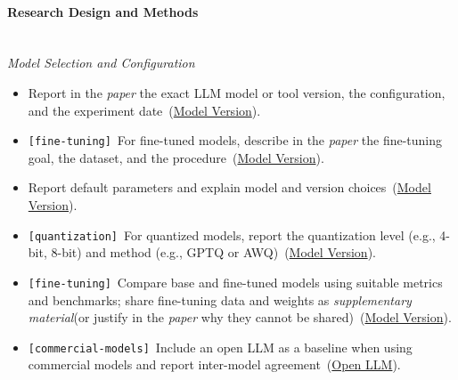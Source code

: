 \documentclass[smallextended]{svjour3}
\makeatletter
\newcommand{\must}{\textbf{must}\xspace}
\newcommand{\should}{\textbf{should}\xspace}
\newcommand{\paper}{\emph{paper}\xspace}
\newcommand{\supplementarymaterial}{\emph{supplementary material}\xspace}
\newcommand{\paper}{\emph{paper}\xspace}
\newcommand{\supplementarymaterial}{\emph{supplementary material}\xspace}
\newcommand{\iconM}{\usebox{\iconMbox}\xspace}
\newcommand{\iconS}{\usebox{\iconSbox}\xspace}
\newcommand{\iconM}{●\xspace}
\newcommand{\iconS}{○\xspace}
\newcommand{\condition}[1]{\texttt{\small[#1]}\,}
\newcommand{\condition}[1]{@@cond:#1@@}
\newcommand{\refmodelversion}{\hyperref[sec:report-model-version-configuration-and-customizations]{Model Version}}
\newcommand{\refopenllm}{\hyperref[sec:use-an-open-llm-as-a-baseline]{Open LLM}}
\newcommand{\refmodelversion}{\href{/guidelines/report-model-version-configuration-and-customizations/}{Model Version}}
\newcommand{\refopenllm}{\href{/guidelines/use-an-open-llm-as-a-baseline/}{Open LLM}}
\makeatother
\begin{document}
\begin{appendices}
\paragraph{\textbf{Research Design and Methods}}\mbox{}\\
\noindent\textit{Model Selection and Configuration}
\begin{itemize}[label={},leftmargin=*]
    \item \iconM Report in the \paper the exact LLM model or tool version, the configuration, and the experiment date~(\refmodelversion).
    \item \iconM \condition{fine-tuning} For fine-tuned models, describe in the \paper the fine-tuning goal, the dataset, and the procedure~(\refmodelversion).
    \item \iconS Report default parameters and explain model and version choices~(\refmodelversion).
    \item \iconS \condition{quantization} For quantized models, report the quantization level (e.g., 4-bit, 8-bit) and method (e.g., GPTQ or AWQ)~(\refmodelversion).
    \item \iconS \condition{fine-tuning} Compare base and fine-tuned models using suitable metrics and benchmarks; share fine-tuning data and weights as \supplementarymaterial (or justify in the \paper why they cannot be shared)~(\refmodelversion).
    \item \iconS \condition{commercial-models} Include an open LLM as a baseline when using commercial models and report inter-model agreement~(\refopenllm).
\end{itemize}


\end{appendices}
\end{document}
